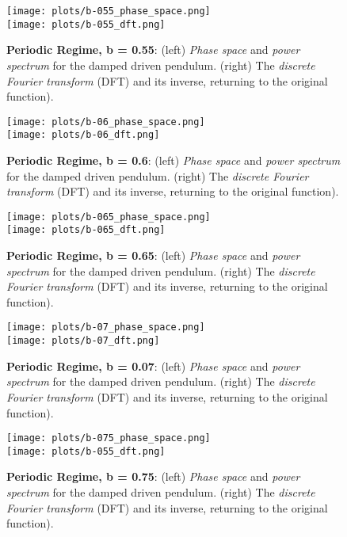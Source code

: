 \documentclass[10pt]{article}
\begin{document}
\begin{figure} [ht]
\begin{center}
\texttt{[image: plots/b-055\_phase\_space.png]} \\
\texttt{[image: plots/b-055\_dft.png]} 
\caption{{\bf Periodic Regime, b = 0.55}: (left) {\it Phase space} and {\it power spectrum} for the damped driven  pendulum. (right) The {\it discrete Fourier transform} (DFT) and its inverse, returning to the original function).}
\end{center}
\end{figure}

\begin{figure} [ht]
\begin{center}
\texttt{[image: plots/b-06\_phase\_space.png]} \\
\texttt{[image: plots/b-06\_dft.png]} 
\caption{{\bf Periodic Regime, b = 0.6}: (left) {\it Phase space} and {\it power spectrum} for the damped driven  pendulum. (right) The {\it discrete Fourier transform} (DFT) and its inverse, returning to the original function).}
\end{center}
\end{figure}

\begin{figure} [ht]
\begin{center}
\texttt{[image: plots/b-065\_phase\_space.png]} \\
\texttt{[image: plots/b-065\_dft.png]} 
\caption{{\bf Periodic Regime, b = 0.65}: (left) {\it Phase space} and {\it power spectrum} for the damped driven  pendulum. (right) The {\it discrete Fourier transform} (DFT) and its inverse, returning to the original function).}
\end{center}
\end{figure}

\begin{figure} [ht]
\begin{center}
\texttt{[image: plots/b-07\_phase\_space.png]} \\
\texttt{[image: plots/b-07\_dft.png]} 
\caption{{\bf Periodic Regime, b = 0.07}: (left) {\it Phase space} and {\it power spectrum} for the damped driven  pendulum. (right) The {\it discrete Fourier transform} (DFT) and its inverse, returning to the original function).}
\end{center}
\end{figure}

\begin{figure} [ht]
\begin{center}
\texttt{[image: plots/b-075\_phase\_space.png]} \\
\texttt{[image: plots/b-055\_dft.png]} 
\caption{{\bf Periodic Regime, b = 0.75}: (left) {\it Phase space} and {\it power spectrum} for the damped driven  pendulum. (right) The {\it discrete Fourier transform} (DFT) and its inverse, returning to the original function).}
\end{center}
\end{figure}
\end{document}
